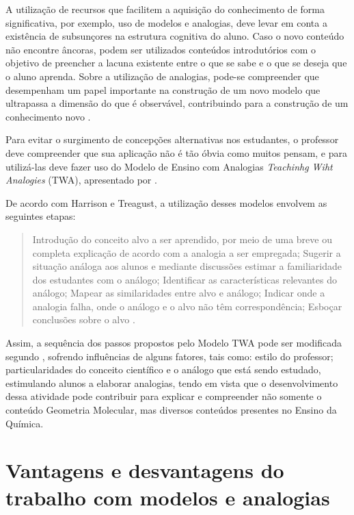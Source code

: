 \begin{refsection}
    A utilização de recursos que facilitem a aquisição do conhecimento de forma significativa, por exemplo, uso de modelos e analogias, deve levar em conta a existência de subsunçores na estrutura cognitiva do aluno. Caso o novo conteúdo não encontre âncoras, podem ser utilizados conteúdos introdutórios com o objetivo de preencher a lacuna existente entre o que se sabe e o que se deseja que o aluno aprenda. Sobre a utilização de analogias, pode-se compreender que desempenham um papel importante na construção de um novo modelo que ultrapassa a dimensão do que é observável, contribuindo para a construção de um conhecimento novo \cite{MORTIMER2000Linguagem}.

    Para evitar o surgimento de concepções alternativas nos estudantes, o professor deve compreender que sua aplicação não é tão óbvia como muitos pensam, e para utilizá-las deve fazer uso do Modelo de Ensino com Analogias \textit{Teachinhg Wiht Analogies} (TWA), apresentado por \textcite{HARRISONAndTREAGUST1993Teaching}. 

    De acordo com Harrison e Treagust, a utilização desses modelos envolvem as seguintes etapas:

    \begin{quotation}
        Introdução do conceito alvo a ser aprendido, por meio de uma breve ou completa explicação de acordo com a analogia a ser empregada; Sugerir a situação análoga aos alunos e mediante discussões estimar a familiaridade dos estudantes com o análogo; Identificar as características relevantes do análogo; Mapear as similaridades entre alvo e análogo; Indicar onde a analogia falha, onde o análogo e o alvo não têm correspondência; Esboçar conclusões sobre o alvo \cite[p.~1291]{HARRISONAndTREAGUST1993Teaching}. 
    \end{quotation}

    Assim, a sequência dos passos propostos pelo Modelo TWA pode ser modificada segundo \textcite{HARRISONAndTREAGUST1993Teaching}, sofrendo influências de alguns fatores, tais como: estilo do professor; particularidades do conceito científico e o análogo que está sendo estudado, estimulando alunos a elaborar analogias, tendo em vista que o desenvolvimento dessa atividade pode contribuir para explicar e compreender não somente o conteúdo Geometria Molecular, mas diversos conteúdos presentes no Ensino da Química. 

    \section{Vantagens e desvantagens do trabalho com modelos e analogias}


\end{refsection}

